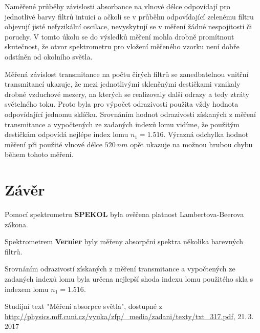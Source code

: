 \documentclass{protokol}
\begin{document}
    Naměřené průběhy závislosti absorbance na vlnové délce odpovídají pro jednotlivé barvy filtrů intuici a ačkoli se v průběhu odpovídající zelenému filtru objevují jisté nefyzikální oscilace, nevyskytují se v měření žádné nespojitosti či poruchy. V tomto úkolu se do výsledků měření mohla drobně promítnout skutečnost, že otvor spektrometru pro vložení měřeného vzorku není dobře odstíněn od okolního světla.

    Měřená závislost transmitance na počtu čirých filtrů se zanedbatelnou vnitřní transmitancí ukazuje, že mezi jednotlivými skleněnými destičkami vznikaly drobné vzduchové mezery, na kterých se realizovaly další odrazy a tedy ztráty světelného toku. Proto byla pro výpočet odrazivosti použita vždy hodnota odpovídající jednomu sklíčku. Srovnáním hodnot odrazivosti získaných z měření transmitance a vypočtených ze zadaných indexů lomu vidíme, že použitým destičkám odpovídá nejlépe index lomu $n_1 = \num{1.516}$. Výrazná odchylka hodnot měření při použité vlnové délce $\SI{520}{nm}$ opět ukazuje na možnou hrubou chybu během tohoto měření.

  \section*{Závěr}

    Pomocí spektrometru \textbf{SPEKOL} byla ověřena platnost Lambertova-Beerova zákona.

    Spektrometrem \textbf{Vernier} byly měřeny absorpční spektra několika barevných filtrů.

    Srovnáním odrazivostí získaných z měření transmitance a vypočtených ze zadaných indexů lomu byla určena nejlepší shoda indexu lomu použitého skla s indexem lomu $n_1 = \num{1.516}$.

  \begin{thebibliography}{}

    Studijní text "Měření absorpce světla", dostupné z\\ \url{http://physics.mff.cuni.cz/vyuka/zfp/_media/zadani/texty/txt_317.pdf}, 21.\,3.\,2017
  
  \end{thebibliography}
\end{document}
